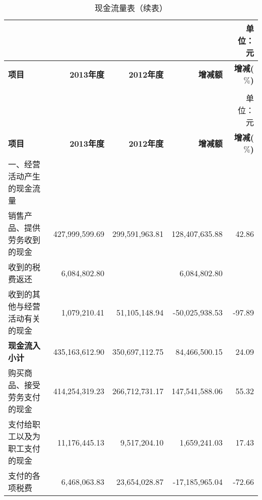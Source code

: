 \renewcommand*{\arraystretch}{0.6}
\setlength{\tabcolsep}{4pt}
\begin{longtable}{>{\scriptsize}l>{\scriptsize}r>{\scriptsize}r>{\scriptsize}r>{\scriptsize}r}
\caption[现金流量表]{现金流量表}\\  %
&&&& {\scriptsize 单位：元}\\
\hline\hline
\rowcolor{mycyan} {\bfseries \scriptsize 项目} & {\bfseries \scriptsize 2013年度}\hspace{2ex} & {\bfseries \scriptsize  2012年度}\hspace{2ex} &  {\bfseries \scriptsize 增减额}\hspace{4ex}      & {\bfseries \scriptsize 增减($\%$)} \\  \endfirsthead          %
\caption[]{现金流量表（续表）} \\ 
&&&& {\scriptsize 单位：元}\\                        %
\hline\hline
\rowcolor{mycyan} {\bfseries \scriptsize 项目} & {\bfseries \scriptsize 2013年度}\hspace{2ex} & {\bfseries \scriptsize  2012年度}\hspace{2ex} &  {\bfseries \scriptsize 增减额}\hspace{4ex}      & {\bfseries \scriptsize 增减($\%$)}  \\  \endhead                %
\hline
\endfoot
\hline   %
一、经营活动产生的现金流量 &  &  &  & 	\\		
\hspace{2em}销售产品、提供劳务收到的现金 & 427,999,599.69 & 299,591,963.81 & 128,407,635.88 & 42.86 \\
\hspace{2em}收到的税费返还 & 6,084,802.80  &  & 6,084,802.80	  & \\
\hspace{2em}收到的其他与经营活动有关的现金 & 1,079,210.41 & 51,105,148.94 & -50,025,938.53 & -97.89 \\
\hspace{2em}\bfseries 现金流入小计 & 435,163,612.90 & 350,697,112.75 & 84,466,500.15 & 24.09 \\
\hspace{2em}购买商品、接受劳务支付的现金 & 414,254,319.23 & 266,712,731.17 & 147,541,588.06 & 55.32 \\
\hspace{2em}支付给职工以及为职工支付的现金 & 11,176,445.13 & 9,517,204.10 & 1,659,241.03 & 17.43 \\
\hspace{2em}支付的各项税费 & 6,468,063.83 & 23,654,028.87 & -17,185,965.04	 & -72.66 \\

\end{longtable}
